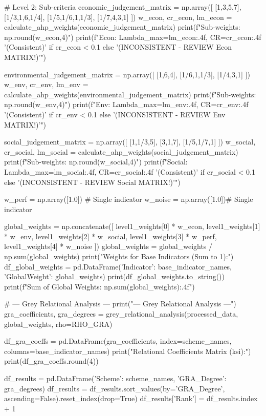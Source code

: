 \documentclass[12pt]{ctexart}
\begin{document}
\begin{python}
    # Level 2: Sub-criteria
    economic_judgement_matrix = np.array([ [1,3,5,7], [1/3,1,6,1/4], [1/5,1/6,1,1/3], [1/7,4,3,1] ])
    w_econ, cr_econ, lm_econ = calculate_ahp_weights(economic_judgement_matrix)
    print(f"\nEconomic Sub-weights: {np.round(w_econ,4)}")
    print(f"Econ: Lambda_max={lm_econ:.4f}, CR={cr_econ:.4f} {'(Consistent)' if cr_econ < 0.1 else '(INCONSISTENT - REVIEW Econ MATRIX!)'}")

    environmental_judgement_matrix = np.array([ [1,6,4], [1/6,1,1/3], [1/4,3,1] ])
    w_env, cr_env, lm_env = calculate_ahp_weights(environmental_judgement_matrix)
    print(f"\nEnvironmental Sub-weights: {np.round(w_env,4)}")
    print(f"Env: Lambda_max={lm_env:.4f}, CR={cr_env:.4f} {'(Consistent)' if cr_env < 0.1 else '(INCONSISTENT - REVIEW Env MATRIX!)'}")

    social_judgement_matrix = np.array([ [1,1/3,5], [3,1,7], [1/5,1/7,1] ])
    w_social, cr_social, lm_social = calculate_ahp_weights(social_judgement_matrix)
    print(f"\nSocial Sub-weights: {np.round(w_social,4)}")
    print(f"Social: Lambda_max={lm_social:.4f}, CR={cr_social:.4f} {'(Consistent)' if cr_social < 0.1 else '(INCONSISTENT - REVIEW Social MATRIX!)'}")

    w_perf = np.array([1.0]) # Single indicator
    w_noise = np.array([1.0])# Single indicator

    global_weights = np.concatenate([
        level1_weights[0] * w_econ, level1_weights[1] * w_env,
        level1_weights[2] * w_social, level1_weights[3] * w_perf,
        level1_weights[4] * w_noise
    ])
    global_weights = global_weights / np.sum(global_weights) 
    print("\nGlobal Weights for Base Indicators (Sum to 1):")
    df_global_weights = pd.DataFrame({'Indicator': base_indicator_names, 'GlobalWeight': global_weights})
    print(df_global_weights.to_string())
    print(f"Sum of Global Weights: {np.sum(global_weights):.4f}")

    # --- Grey Relational Analysis ---
    print("\n--- Grey Relational Analysis ---")
    gra_coefficients, gra_degrees = grey_relational_analysis(processed_data, global_weights, rho=RHO_GRA)
    
    df_gra_coeffs = pd.DataFrame(gra_coefficients, index=scheme_names, columns=base_indicator_names)
    print("\nGrey Relational Coefficients Matrix (ksi):")
    print(df_gra_coeffs.round(4))
    
    df_results = pd.DataFrame({'Scheme': scheme_names, 'GRA_Degree': gra_degrees})
    df_results = df_results.sort_values(by='GRA_Degree', ascending=False).reset_index(drop=True)
    df_results['Rank'] = df_results.index + 1
    

\end{python}
\end{document}
